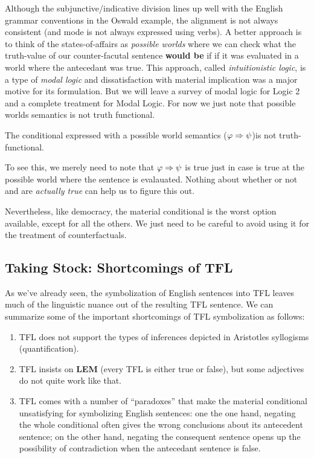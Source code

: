 Although the subjunctive/indicative division lines up well with the English
grammar conventions in the Oswald example, the alignment is not always
consistent (and mode is not always expressed using verbs). A better approach
is to think of the states-of-affairs as \emph{possible worlds} where we can
check what the truth-value of our counter-facutal sentence \textbf{would be} if
if it was evaluated in a world where the antecedant was true. This approach,
called \emph{intuitionistic logic}, is a type of \emph{modal logic} and
dissatisfaction with material implication was a major motive for its
formulation. But we will leave a survey of modal logic for Logic 2 and a
complete treatment for Modal Logic. For now we just note that possible worlds
semantics is not truth functional.

\begin{observation}
  The conditional expressed with a possible world semantics
  ($\varphi\Rightarrow\psi$)is not truth-functional.
\end{observation}

To see this, we merely need to note that $\varphi\Rightarrow\psi$ is true just
in case \spsi is true at the possible world where the sentence is evalauated.
Nothing about whether or not \sphi and \spsi are \emph{actually true} can help
us to figure this out.

Nevertheless, like democracy, the material conditional is the worst option
available, except for all the others. We just need to be careful to avoid
using it for the treatment of counterfactuals.

\subsection{Taking Stock: Shortcomings of TFL}

As we've already seen, the symbolization of English sentences into TFL leaves
much of the linguistic nuance out of the resulting TFL sentence. We can
summarize some of the important shortcomings of TFL symbolization as follows:

\begin{observation}
  \label{obs:tfl-shortcomings}
  \begin{enumerate}
  \item TFL does not support the types of inferences depicted in Aristotles
    syllogisms (quantification).
  \item TFL insists on \textbf{LEM} (every TFL is either true
    or false), but some adjectives do not quite work like that.
  \item TFL comes with a number of ``paradoxes'' that make the material
    conditional unsatisfying for symbolizing English sentences: one the one
    hand, negating the whole conditional often gives the wrong conclusions
    about its antecedent sentence; on the other hand, negating the consequent
    sentence opens up the possibility of contradiction when the antecedant
    sentence is false.
  \end{enumerate}
\end{observation}

